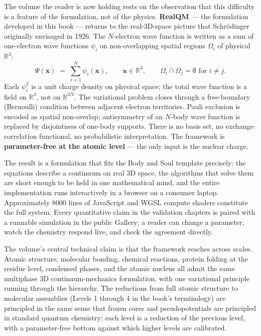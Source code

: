 The volume the reader is now holding rests on the observation that this difficulty is a feature of the formulation, not of the physics. \textbf{RealQM} --- the formulation developed in this book --- returns to the real-3D-space picture that Schr\"odinger originally envisaged in 1926. The $N$-electron wave function is written as a sum of one-electron wave functions $\psi_i$ on non-overlapping spatial regions $\Omega_i$ of physical $\mathbb{R}^3$:
\[
\Psi(\mathbf{x}) \;=\; \sum_{i=1}^N \psi_i(\mathbf{x}), \qquad \mathbf{x} \in \mathbb{R}^3, \qquad \Omega_i \cap \Omega_j = \emptyset \text{ for } i \ne j.
\]
Each $\psi_i^2$ is a unit charge density on physical space; the total wave function is a field on $\mathbb{R}^3$, not on $\mathbb{R}^{3N}$. The variational problem closes through a free-boundary (Bernoulli) condition between adjacent electron territories. Pauli exclusion is encoded as spatial non-overlap; antisymmetry of an $N$-body wave function is replaced by disjointness of one-body supports. There is no basis set, no exchange--correlation functional, no probabilistic interpretation. The framework is \textbf{parameter-free at the atomic level} --- the only input is the nuclear charge.

The result is a formulation that fits the Body and Soul template precisely: the equations describe a continuum on real 3D space, the algorithms that solve them are short enough to be held in one mathematical mind, and the entire implementation runs interactively in a browser on a consumer laptop. Approximately 8000 lines of JavaScript and WGSL compute shaders constitute the full system. Every quantitative claim in the validation chapters is paired with a runnable simulation in the public Gallery; a reader can change a parameter, watch the chemistry respond live, and check the agreement directly.

The volume's central technical claim is that the framework reaches across scales. Atomic structure, molecular bonding, chemical reactions, protein folding at the residue level, condensed phases, and the atomic nucleus all admit the same multiphase 3D continuum-mechanics formulation, with one variational principle running through the hierarchy. The reductions from full atomic structure to molecular assemblies (Levels 1 through 4 in the book's terminology) are principled in the same sense that frozen cores and pseudopotentials are principled in standard quantum chemistry: each level is a reduction of the previous level, with a parameter-free bottom against which higher levels are calibrated.

